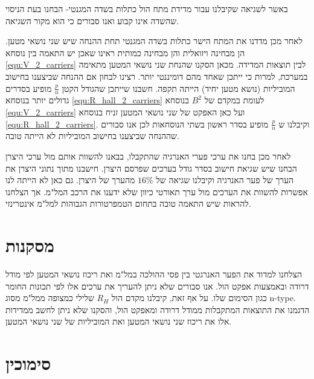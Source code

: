 \documentclass{article}
\begin{document}
באשר לשגיאה שקיבלנו עבור מדידת מתח הול כתלות בשדה המגנטי- הבחנו בעת הניסוי שהשדה אינו קבוע ואנו סבורים כי הוא מקור השגיאה. 

לאחר מכן מדדנו את המתח הישר כתלות בשדה המגנטי תחת ההנחה שיש שני נושאי מטען.
הן מבחינה ויזואלית והן מבחינה כמותית ראינו שאכן יש התאמה בין נוסחא
\ref{equ:V_2_carriers}
לבין תוצאות המדידה. מכאן הסקנו שהנחת שני נושאי המטען מתאימה במערכת, למרות כי ייתכן שאחד מהם דומיננטי יותר.
רצינו לבחון אם ההנחה שביצענו בחישוב המוביליות (נושא מטען יחיד)
הייתה תקפה.
חשבנו שייתכן שהגודל הקטן
$\frac{p}{n}$
מופיע בסדרים גדולים יותר בנוסחא
\ref{equ:R_hall_2_carriers}
לעומת במקדם של 
$B^2$
בנוסחא
\ref{equ:V_2_carriers}
ועל כאן האפקט של שני נושאי המטען זניח בנוסחא
\ref{equ:R_hall_2_carriers}.
וקיבלנו ש
$\frac{p}{n}$
מופיע בסדר ראשון בשתי הנוסחאות לכן אנו סבורים שההנחה שביצענו בחישוב המוביליות לא הייתה טובה.

לאחר מכן בחנו את ערכי פערי האנרגיה שהתקבלו,
בבאנו להשוות אותם מול ערכי היצרן הבחנו שיש שגיאת חישוב בסדר גודל בערכים שפרסם היצרן.
חישבנו מתוך נתוני היצרן את הערך של פער האנרגיה וקיבלנו שגיאה של 
$16\%$
מהערך של היצרן.
גם כאן לא הייתה לנו אפשרות להשוות את הערכים מול ערך תאורטי כיוון שלא ידענו את הרכב המל"מ.
אך הצלחנו להראות שיש התאמה טובה בתחום הטמפרטורות הגבוהות למל"מ אינטרינזי.

\section{מסקנות}

הצלחנו למדוד את הפער האנרגטי בין פסי ההולכה במל"מ ואת ריכוז נושאי המטען לפי מודל דרודה ובאמצעות אפקט הול. אנו סבורים שלא ניתן להעריך את ערכים אלו לפי תכונות החומר כגון הסימום שלו. על אף זאת, קיבלנו מקדם הול
$R_H$
שלילי כמצופה ממל"מ מסוג
\textenglish{n-type}.
הדגמנו את התוצאות המתקבלות ממודל דרודה ומאפקט הול, והסקנו שלא ניתן לחשב ממדידות אלו את ריכוז שני נושאי המטען ואת המוביליות של שני נושאי המטען.

\section*{סימוכין}
\begin{english}
\printbibliography[heading=none]{}
\end{english}
\end{document}
